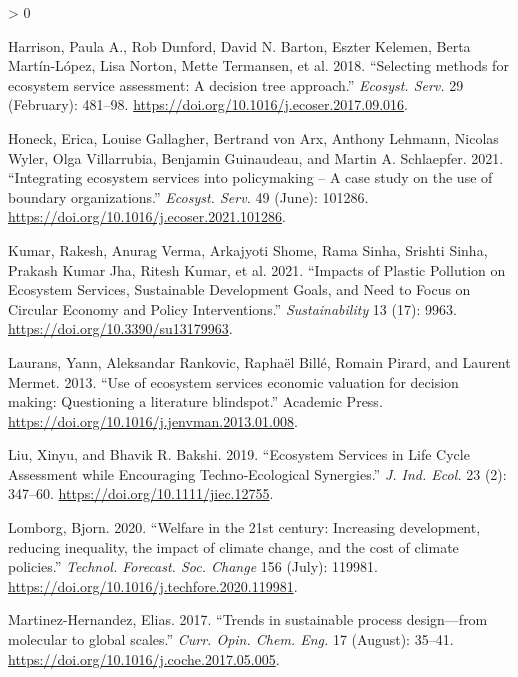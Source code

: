 \documentclass[
]{article}
\newlength{\cslhangindent}
\newenvironment{CSLReferences}[2] %
 {%
  \setlength{\parindent}{0pt}
  \ifodd #1 \everypar{\setlength{\hangindent}{\cslhangindent}}\ignorespaces\fi
  \ifnum #2 > 0
  \setlength{\parskip}{#2\baselineskip}
  \fi
 }%
 {}
\begin{document}
\begin{CSLReferences}{1}{0}
\leavevmode\hypertarget{ref-Harrison2018}{}%
Harrison, Paula A., Rob Dunford, David N. Barton, Eszter Kelemen, Berta Martín-López, Lisa Norton, Mette Termansen, et al. 2018. {``{Selecting methods for ecosystem service assessment: A decision tree approach}.''} \emph{Ecosyst. Serv.} 29 (February): 481--98. \url{https://doi.org/10.1016/j.ecoser.2017.09.016}.

\leavevmode\hypertarget{ref-Honeck2021}{}%
Honeck, Erica, Louise Gallagher, Bertrand von Arx, Anthony Lehmann, Nicolas Wyler, Olga Villarrubia, Benjamin Guinaudeau, and Martin A. Schlaepfer. 2021. {``{Integrating ecosystem services into policymaking -- A case study on the use of boundary organizations}.''} \emph{Ecosyst. Serv.} 49 (June): 101286. \url{https://doi.org/10.1016/j.ecoser.2021.101286}.

\leavevmode\hypertarget{ref-Kumar2021}{}%
Kumar, Rakesh, Anurag Verma, Arkajyoti Shome, Rama Sinha, Srishti Sinha, Prakash Kumar Jha, Ritesh Kumar, et al. 2021. {``{Impacts of Plastic Pollution on Ecosystem Services, Sustainable Development Goals, and Need to Focus on Circular Economy and Policy Interventions}.''} \emph{Sustainability} 13 (17): 9963. \url{https://doi.org/10.3390/su13179963}.

\leavevmode\hypertarget{ref-Laurans2013}{}%
Laurans, Yann, Aleksandar Rankovic, Raphaël Billé, Romain Pirard, and Laurent Mermet. 2013. {``{Use of ecosystem services economic valuation for decision making: Questioning a literature blindspot}.''} Academic Press. \url{https://doi.org/10.1016/j.jenvman.2013.01.008}.

\leavevmode\hypertarget{ref-Liu2019g}{}%
Liu, Xinyu, and Bhavik R. Bakshi. 2019. {``{Ecosystem Services in Life Cycle Assessment while Encouraging Techno‐Ecological Synergies}.''} \emph{J. Ind. Ecol.} 23 (2): 347--60. \url{https://doi.org/10.1111/jiec.12755}.

\leavevmode\hypertarget{ref-Lomborg2020}{}%
Lomborg, Bjorn. 2020. {``{Welfare in the 21st century: Increasing development, reducing inequality, the impact of climate change, and the cost of climate policies}.''} \emph{Technol. Forecast. Soc. Change} 156 (July): 119981. \url{https://doi.org/10.1016/j.techfore.2020.119981}.

\leavevmode\hypertarget{ref-Martinez-Hernandez2017}{}%
Martinez-Hernandez, Elias. 2017. {``{Trends in sustainable process design---from molecular to global scales}.''} \emph{Curr. Opin. Chem. Eng.} 17 (August): 35--41. \url{https://doi.org/10.1016/j.coche.2017.05.005}.


\end{CSLReferences}
\end{document}
